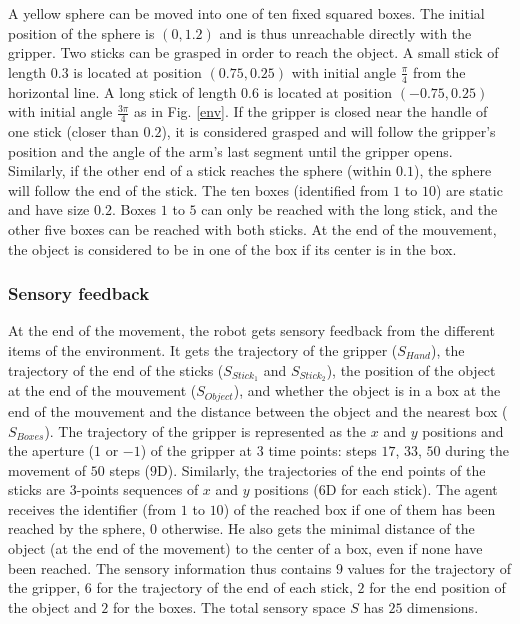 \documentclass[10pt,letterpaper]{article}
\begin{document}
			A yellow sphere can be moved into one of ten fixed squared boxes. 
			The initial position of the sphere is $(0, 1.2)$ and is thus unreachable directly with the gripper.
			Two sticks can be grasped in order to reach the object.
			A small stick of length $0.3$ is located at position $(0.75, 0.25)$ with initial angle $\frac{\pi}{4}$ from the horizontal line.
			A long stick of length $0.6$ is located at position $(-0.75, 0.25)$ with initial angle $\frac{3\pi}{4}$ as in Fig. \ref{env}.			
			If the gripper is closed near the handle of one stick (closer than $0.2$), it is considered grasped and will follow the gripper's position and the angle of the arm's last segment until the gripper opens.			
			Similarly, if the other end of a stick reaches the sphere (within $0.1$), the sphere will follow the end of the stick.
			The ten boxes (identified from $1$ to $10$) are static and have size $0.2$.
			Boxes $1$ to $5$ can only be reached with the long stick, and the other five boxes can be reached with both sticks.
			At the end of the mouvement, the object is considered to be in one of the box if its center is in the box.
		
		
		\subsubsection{Sensory feedback}
		
			At the end of the movement, the robot gets sensory feedback from the different items of the environment.
			It gets the trajectory of the gripper ($S_{Hand}$), the trajectory of the end of the sticks ($S_{Stick_1}$ and $S_{Stick_2}$), 
			the position of the object at the end of the mouvement ($S_{Object}$), and whether the object is in a box at the end of the mouvement and the distance between the object and the nearest box ($S_{Boxes}$).		
			The trajectory of the gripper is represented as the $x$ and $y$ positions and the aperture ($1$ or $-1$) of the gripper at $3$ time points: 
			steps $17$, $33$, $50$ during the movement of $50$ steps ($9$D).
			Similarly, the trajectories of the end points of the sticks are $3$-points sequences of $x$ and $y$ positions ($6$D for each stick).
			The agent receives the identifier (from $1$ to $10$) of the reached box if one of them has been reached by the sphere, 0 otherwise. 
			He also gets the minimal distance of the object (at the end of the movement) to the center of a box, even if none have been reached.			 
			The sensory information thus contains $9$ values for the trajectory of the gripper, $6$ for the trajectory of the end of each stick, $2$ for the end position of the object and $2$ for the boxes.
			The total sensory space $S$ has $25$ dimensions.
			
\end{document}
